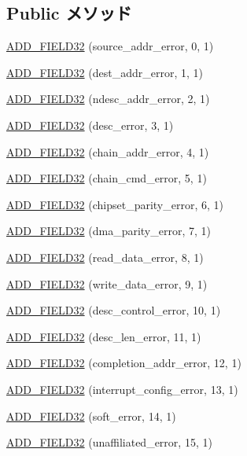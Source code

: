 \subsection*{Public メソッド}
\begin{DoxyCompactItemize}
\item 
\hyperlink{structCopyEngineReg_1_1ChanRegs_1_1CHANERR_a48d94d41c04158e9f02d4cc48ab77a06}{ADD\_\-FIELD32} (source\_\-addr\_\-error, 0, 1)
\item 
\hyperlink{structCopyEngineReg_1_1ChanRegs_1_1CHANERR_a35acbab1d98292239b1da861c893da51}{ADD\_\-FIELD32} (dest\_\-addr\_\-error, 1, 1)
\item 
\hyperlink{structCopyEngineReg_1_1ChanRegs_1_1CHANERR_a2b5d8942965aa97b7a9a334456ea463a}{ADD\_\-FIELD32} (ndesc\_\-addr\_\-error, 2, 1)
\item 
\hyperlink{structCopyEngineReg_1_1ChanRegs_1_1CHANERR_a2ec2c0cf1992734878a70931011d1fe9}{ADD\_\-FIELD32} (desc\_\-error, 3, 1)
\item 
\hyperlink{structCopyEngineReg_1_1ChanRegs_1_1CHANERR_a1302caf4c473f0664114012c459d6df4}{ADD\_\-FIELD32} (chain\_\-addr\_\-error, 4, 1)
\item 
\hyperlink{structCopyEngineReg_1_1ChanRegs_1_1CHANERR_abefd2d06519d59f6e756294b91e907c0}{ADD\_\-FIELD32} (chain\_\-cmd\_\-error, 5, 1)
\item 
\hyperlink{structCopyEngineReg_1_1ChanRegs_1_1CHANERR_a1bc34aa4aa32c4117bbd0ab58e14643d}{ADD\_\-FIELD32} (chipset\_\-parity\_\-error, 6, 1)
\item 
\hyperlink{structCopyEngineReg_1_1ChanRegs_1_1CHANERR_a9c77fea11dba17bd40fef716a024dd37}{ADD\_\-FIELD32} (dma\_\-parity\_\-error, 7, 1)
\item 
\hyperlink{structCopyEngineReg_1_1ChanRegs_1_1CHANERR_a3f53d318d26e58689df8ea081c809096}{ADD\_\-FIELD32} (read\_\-data\_\-error, 8, 1)
\item 
\hyperlink{structCopyEngineReg_1_1ChanRegs_1_1CHANERR_ac7ae8b3ab672062bdae6da6997bf9ddd}{ADD\_\-FIELD32} (write\_\-data\_\-error, 9, 1)
\item 
\hyperlink{structCopyEngineReg_1_1ChanRegs_1_1CHANERR_a7c03dbdc71e0b2610fa3395fc9a55deb}{ADD\_\-FIELD32} (desc\_\-control\_\-error, 10, 1)
\item 
\hyperlink{structCopyEngineReg_1_1ChanRegs_1_1CHANERR_ab312600c31b82b5129c2a875f7174981}{ADD\_\-FIELD32} (desc\_\-len\_\-error, 11, 1)
\item 
\hyperlink{structCopyEngineReg_1_1ChanRegs_1_1CHANERR_ab2f937b1f9af99bd4c376f2a80992cd9}{ADD\_\-FIELD32} (completion\_\-addr\_\-error, 12, 1)
\item 
\hyperlink{structCopyEngineReg_1_1ChanRegs_1_1CHANERR_ab8427d215b1b793ae3628ab0f063e200}{ADD\_\-FIELD32} (interrupt\_\-config\_\-error, 13, 1)
\item 
\hyperlink{structCopyEngineReg_1_1ChanRegs_1_1CHANERR_a6882134458e358d77d10305ed2d16729}{ADD\_\-FIELD32} (soft\_\-error, 14, 1)
\item 
\hyperlink{structCopyEngineReg_1_1ChanRegs_1_1CHANERR_a419b930638b7daf2a79225b2c8aa2a07}{ADD\_\-FIELD32} (unaffiliated\_\-error, 15, 1)
\end{DoxyCompactItemize}


